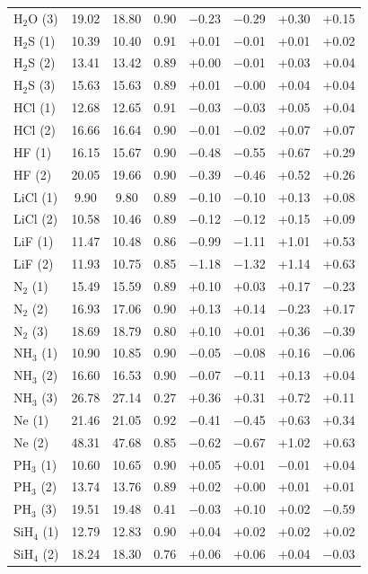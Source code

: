 \documentclass[aip,jcp,reprint,noshowkeys,superscriptaddress]{revtex4-1}
\begin{document}
\begin{table}[hbt!]
\begin{tabular}{lccccccc}
H$_2$O (3) & 19.02 & 18.80 & 0.90 & $-$0.23 & $-$0.29 & +0.30 & +0.15 \\
H$_2$S (1) & 10.39 & 10.40 & 0.91 & +0.01 & $-$0.01 & +0.01 & +0.02 \\
H$_2$S (2) & 13.41 & 13.42 & 0.89 & +0.00 & $-$0.01 & +0.03 & +0.04 \\
H$_2$S (3) & 15.63 & 15.63 & 0.89 & +0.01 & $-$0.00 & +0.04 & +0.04 \\
HCl (1) & 12.68 & 12.65 & 0.91 & $-$0.03 & $-$0.03 & +0.05 & +0.04 \\
HCl (2) & 16.66 & 16.64 & 0.90 & $-$0.01 & $-$0.02 & +0.07 & +0.07 \\
HF (1) & 16.15 & 15.67 & 0.90 & $-$0.48 & $-$0.55 & +0.67 & +0.29 \\
HF (2) & 20.05 & 19.66 & 0.90 & $-$0.39 & $-$0.46 & +0.52 & +0.26 \\
LiCl (1) & 9.90 & 9.80 & 0.89 & $-$0.10 & $-$0.10 & +0.13 & +0.08 \\
LiCl (2) & 10.58 & 10.46 & 0.89 & $-$0.12 & $-$0.12 & +0.15 & +0.09 \\
LiF (1) & 11.47 & 10.48 & 0.86 & $-$0.99 & $-$1.11 & +1.01 & +0.53 \\
LiF (2) & 11.93 & 10.75 & 0.85 & $-$1.18 & $-$1.32 & +1.14 & +0.63 \\
N$_2$ (1) & 15.49 & 15.59 & 0.89 & +0.10 & +0.03 & +0.17 & $-$0.23 \\
N$_2$ (2) & 16.93 & 17.06 & 0.90 & +0.13 & +0.14 & $-$0.23 & +0.17 \\
N$_2$ (3) & 18.69 & 18.79 & 0.80 & +0.10 & +0.01 & +0.36 & $-$0.39 \\
NH$_3$ (1) & 10.90 & 10.85 & 0.90 & $-$0.05 & $-$0.08 & +0.16 & $-$0.06 \\
NH$_3$ (2) & 16.60 & 16.53 & 0.90 & $-$0.07 & $-$0.11 & +0.13 & +0.04 \\
NH$_3$ (3) & 26.78 & 27.14 & 0.27 & +0.36 & +0.31 & +0.72 & +0.11 \\
Ne (1) & 21.46 & 21.05 & 0.92 & $-$0.41 & $-$0.45 & +0.63 & +0.34 \\
Ne (2) & 48.31 & 47.68 & 0.85 & $-$0.62 & $-$0.67 & +1.02 & +0.63 \\
PH$_3$ (1) & 10.60 & 10.65 & 0.90 & +0.05 & +0.01 & $-$0.01 & +0.04 \\
PH$_3$ (2) & 13.74 & 13.76 & 0.89 & +0.02 & +0.00 & +0.01 & +0.01 \\
PH$_3$ (3) & 19.51 & 19.48 & 0.41 & $-$0.03 & +0.10 & +0.02 & $-$0.59 \\
SiH$_4$ (1) & 12.79 & 12.83 & 0.90 & +0.04 & +0.02 & +0.02 & +0.02 \\
SiH$_4$ (2) & 18.24 & 18.30 & 0.76 & +0.06 & +0.06 & +0.04 & $-$0.03 \\
\bottomrule
\end{tabular}
\end{table}
\end{document}

